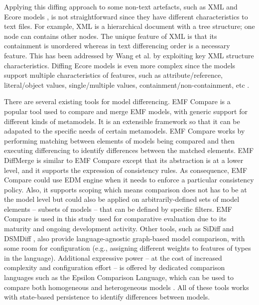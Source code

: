 Applying this diffing approach to some non-text artefacts, such as XML \cite{w3c-xml} and Ecore models \cite{steinberg2008emf}, is not straightforward since they have different characteristics to text files. For example, XML is a hierarchical document with a tree structure; one node can contains other nodes. The unique feature of XML is that its containment is  unordered whereas in text differencing order is a necessary feature. This has been addressed by Wang et al. \cite{wang2003xdiff} by exploiting key XML  structure characteristics. Diffing Ecore models is even more complex since the models support multiple characteristics of features, such as attribute/reference, literal/object values, single/multiple values, containment/non-containment, etc \cite{steinberg2008emf}. 

There are several existing tools for model differencing. EMF Compare \cite{emfcompare2018developer} is a popular tool used to compare and merge EMF models, with generic support for different kinds of metamodels. It is an extensible framework so that it can be adapated to the specific needs of certain metamodels. EMF Compare works by performing matching between elements of models being compared and then executing differencing to identify differences between the matched elements. EMF DiffMerge \cite{eclipse2019emfdiffmerge} is similar to EMF Compare except that its abstraction is at a lower level, and it supports the expression of consistency rules. As consequence, EMF Compare could use EDM engine when it needs to enforce a particular consistency policy. Also, it supports scoping which means comparison does not has to be at the model level but could also be applied on arbitrarily-defined sets of model elements -- subsets of models -- that can be defined by specific filters. EMF Compare is used in this study used for comparative evaluation due to its maturity and ongoing development activity. Other tools, such as SiDiff \cite{Treude2007SiDiff} and DSMDiff \cite{lin2009dsmdiff}, also provide language-agnostic graph-based model comparison, with some room for configuration (e.g., assigning different weights to features of types in the language). Additional expressive power -- at the cost of increased complexity and configuration effort -- is offered by dedicated comparison languages such as the Epsilon Comparison Language, which can be used to compare both homogeneous and heterogeneous models \cite{kolovos2009ecl}. All of these tools works with state-based persistence to identify differences between models.

